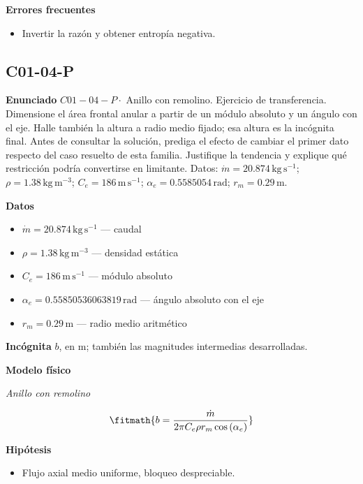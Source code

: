 \documentclass[10pt,openany]{book}
\begin{document}
\noindent\textbf{Errores frecuentes}
\begin{itemize}
\item Invertir la razón y obtener entropía negativa.
\end{itemize}
\subsection*{C01-04-P}

\noindent\textbf{Enunciado}
\(C01-04-P \cdot\) Anillo con remolino. Ejercicio de transferencia. Dimensione el área frontal anular a partir de un módulo absoluto y un ángulo con el eje. Halle también la altura a radio medio fijado; esa altura es la incógnita final. Antes de consultar la solución, prediga el efecto de cambiar el primer dato respecto del caso resuelto de esta familia. Justifique la tendencia y explique qué restricción podría convertirse en limitante. Datos: \(\dot m=20.874\, \mathrm{kg}\,\mathrm{s}^{-1}\); \(\rho=1.38\, \mathrm{kg}\,\mathrm{m}^{-3}\); \(C_e=186\, \mathrm{m}\,\mathrm{s}^{-1}\); \(\alpha_e=0.5585054\, \mathrm{rad}\); \(r_m=0.29\, \mathrm{m}\).

\noindent\textbf{Datos}
\begin{itemize}
\item $\dot m = 20.874\,\mathrm{kg}\,\mathrm{s}^{-1}$ — caudal
\item $\rho = 1.38\,\mathrm{kg}\,\mathrm{m}^{-3}$ — densidad estática
\item $C_e = 186\,\mathrm{m}\,\mathrm{s}^{-1}$ — módulo absoluto
\item $\alpha_e = 0.55850536063819\,\mathrm{rad}$ — ángulo absoluto con el eje
\item $r_m = 0.29\,\mathrm{m}$ — radio medio aritmético
\end{itemize}

\noindent\textbf{Incógnita}
$b$, en $\mathrm{m}$; también las magnitudes intermedias desarrolladas.

\noindent\textbf{Modelo físico}

\noindent\textit{Anillo con remolino}

\[
\fitmath{b=\frac{\dot m}{2 \pi C_e \rho r_m \cos{\left(\alpha_e \right)}}}
\]

\noindent\textbf{Hipótesis}
\begin{itemize}
\item Flujo axial medio uniforme, bloqueo despreciable.
\end{itemize}
\end{document}

